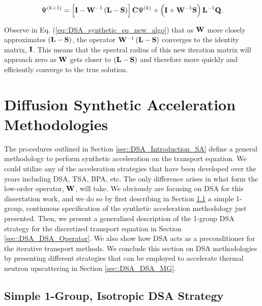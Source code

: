 \begin{equation}
\label{eq::DSA_synthetic_eq_new_algo}
\Psi^{(k+1)} = \left[  {\bf I} - {\bf W}^{-1} \left(  {\bf L} - {\bf S}  \right)  \right] {\bf C} \Psi^{(k)} + \left({\bf I} + {\bf W}^{-1} {\bf S} \right) {\bf L}^{-1} {\bf Q} .
\end{equation}

\noindent Observe in Eq. (\ref{eq::DSA_synthetic_eq_new_algo}) that as ${\bf W}$ more closely approximates $\left(  {\bf L} - {\bf S}  \right)$, the operator ${\bf W}^{-1} \left(  {\bf L} - {\bf S}  \right)$ converges to the identity matrix, ${\bf I}$. This means that the spectral radius of this new iteration matrix will approach zero as ${\bf W}$ gets closer to $\left(  {\bf L} - {\bf S}  \right)$ and therefore more quickly and efficiently converge to the true solution. 

\section{Diffusion Synthetic Acceleration Methodologies}
\label{sec::DSA_DSA}

The procedures outlined in Section \ref{sec::DSA_Introduction_SA} define a general methodology to perform synthetic acceleration on the transport equation. We could utilize any of the acceleration strategies that have been developed over the years including DSA, TSA, BPA, etc. The only difference arises in what form the low-order operator, ${\bf W}$, will take. We obviously are focusing on DSA for this dissertation work, and we do so by first describing in Section \ref{sec::DSA_DSA_1G} a simple 1-group, continuous specification of the synthetic acceleration methodology just presented. Then, we present a generalized description of the 1-group DSA strategy for the discretized transport equation in Section \ref{sec::DSA_DSA_Operator}. We also show how DSA acts as a preconditioner for the iterative transport methods. We conclude this section on DSA methodologies by presenting different strategies that can be employed to accelerate thermal neutron upscattering in Section \ref{sec::DSA_DSA_MG}.

\subsection{Simple 1-Group, Isotropic DSA Strategy}
\label{sec::DSA_DSA_1G}


